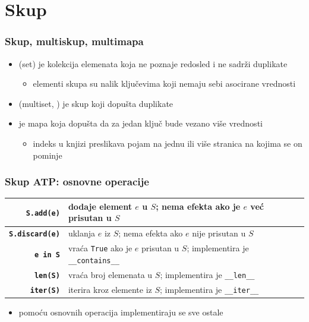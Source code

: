 \documentclass[compress,aspectratio=169]{beamer}
\begin{document}
\section[Skup]{Skup}
\begin{frame}[fragile]
  \frametitle{Skup, multiskup, multimapa}
  \begin{itemize}
    \item {} (set) je kolekcija elemenata koja ne poznaje redosled i ne sadrži duplikate
    \begin{itemize}
      \item elementi skupa su nalik ključevima koji nemaju sebi asocirane vrednosti
    \end{itemize}
    \item {} (multiset, ) je skup koji dopušta duplikate
    \item {} je mapa koja dopušta da za jedan ključ bude vezano više vrednosti
    \begin{itemize}
      \item indeks u knjizi preslikava pojam na jednu ili više stranica na kojima se on pominje
    \end{itemize}
  \end{itemize}
\end{frame}

\begin{frame}[fragile]
  \frametitle{Skup ATP: osnovne operacije}
  \begin{center}
    \begin{tabular}{rp{11cm}}
      \textbf{\texttt{S.add(e)}} & dodaje element $e$ u $S$; nema efekta ako je $e$ već prisutan u $S$\\ \hline
      \textbf{\texttt{S.discard(e)}} & uklanja $e$ iz $S$; nema efekta ako $e$ nije prisutan u $S$\\ \hline
      \textbf{\texttt{e in S}} & vraća \texttt{True} ako je $e$ prisutan u $S$; implementira je \texttt{\_\_contains\_\_} \\ \hline
      \textbf{\texttt{len(S)}} & vraća broj elemenata u $S$; implementira je \texttt{\_\_len\_\_} \\ \hline
      \textbf{\texttt{iter(S)}} & iterira kroz elemente iz $S$; implementira je \texttt{\_\_iter\_\_} \\
    \end{tabular}
  \end{center}
  \begin{itemize}
    \item pomoću osnovnih operacija implementiraju se sve ostale
  \end{itemize}
\end{frame}
\end{document}
